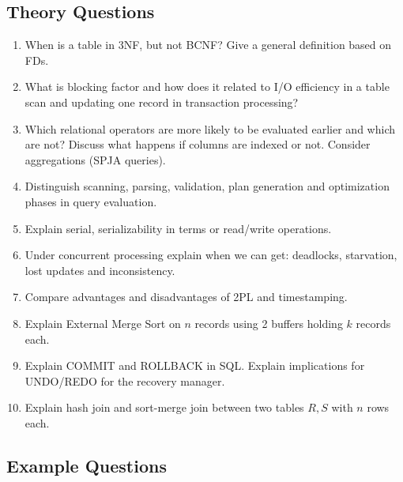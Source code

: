 \subsection*{Theory Questions}

\begin{enumerate}

\item When is a table in 3NF, but not BCNF? 
Give a general definition based on FDs.

\item What is blocking factor and how does it related to I/O efficiency in a table scan
and updating one record in transaction processing?

\item Which relational operators are more likely to be evaluated earlier
and which are not?
Discuss what happens if columns are indexed or not.
Consider aggregations (SPJA queries).

\item Distinguish scanning, parsing, validation, plan generation and optimization phases in query evaluation.

\item Explain serial, serializability in terms or read/write operations.

\item Under concurrent processing explain when we can get: deadlocks, starvation, lost updates
 and inconsistency.

\item Compare advantages and disadvantages of 2PL and timestamping.

\item Explain External Merge Sort on $n$ records using 2 buffers holding $k$ records each.

\item Explain COMMIT and ROLLBACK in SQL. Explain implications for UNDO/REDO for the recovery manager.

\item Explain hash join and sort-merge join between two tables $R,S$ with $n$ rows each.

\end{enumerate}

\subsection*{Example Questions}

